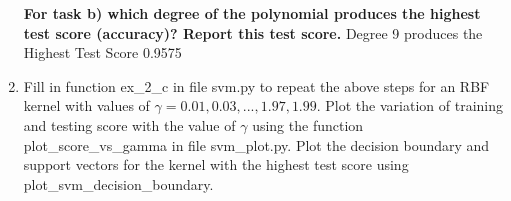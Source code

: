 \documentclass[a4paper]{article}
\begin{document}
\begin{enumerate}[label=(\alph*)]
\textbf{For task b) which degree of the polynomial produces the highest test score (accuracy)? Report this
test score.} \newline
Degree 9 produces the Highest Test Score 0.9575

\newpage

\item Fill in function ex\_2\_c in file svm.py to repeat the above steps for an RBF kernel with values of $\gamma = 0.01, 0.03, . . . , 1.97, 1.99$. Plot the variation of training and testing score with the value of $\gamma$ using the function plot\_score\_vs\_gamma in file svm\_plot.py. Plot the decision boundary and support vectors for the kernel with the highest test score using plot\_svm\_decision\_boundary.
\newline \newline


\end{enumerate}
\end{document}
